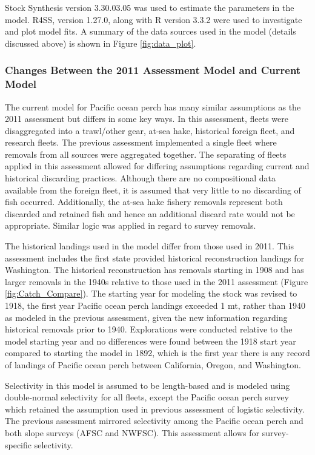 \documentclass[12pt,]{article}
\begin{document}
Stock Synthesis version 3.30.03.05 was used to estimate the parameters
in the model. R4SS, version 1.27.0, along with R version 3.3.2 were used
to investigate and plot model fits. A summary of the data sources used
in the model (details discussed above) is shown in Figure
\ref{fig:data_plot}.

\subsubsection{Changes Between the 2011 Assessment Model and Current
Model}\label{changes-between-the-2011-assessment-model-and-current-model}

The current model for Pacific ocean perch has many similar assumptions
as the 2011 assessment but differs in some key ways. In this assessment,
fleets were disaggregated into a trawl/other gear, at-sea hake,
historical foreign fleet, and research fleets. The previous assessment
implemented a single fleet where removals from all sources were
aggregated together. The separating of fleets applied in this assessment
allowed for differing assumptions regarding current and historical
discarding practices. Although there are no compositional data available
from the foreign fleet, it is assumed that very little to no discarding
of fish occurred. Additionally, the at-sea hake fishery removals
represent both discarded and retained fish and hence an additional
discard rate would not be appropriate. Similar logic was applied in
regard to survey removals.

The historical landings used in the model differ from those used in
2011. This assessment includes the first state provided historical
reconstruction landings for Washington. The historical reconstruction
has removals starting in 1908 and has larger removals in the 1940s
relative to those used in the 2011 assessment (Figure
\ref{fig:Catch_Compare}). The starting year for modeling the stock was
revised to 1918, the first year Pacific ocean perch landings exceeded 1
mt, rather than 1940 as modeled in the previous assessment, given the
new information regarding historical removals prior to 1940.
Explorations were conducted relative to the model starting year and no
differences were found between the 1918 start year compared to starting
the model in 1892, which is the first year there is any record of
landings of Pacific ocean perch between California, Oregon, and
Washington.

Selectivity in this model is assumed to be length-based and is modeled
using double-normal selectivity for all fleets, except the Pacific ocean
perch survey which retained the assumption used in previous assessment
of logistic selectivity. The previous assessment mirrored selectivity
among the Pacific ocean perch and both slope surveys (AFSC and NWFSC).
This assessment allows for survey-specific selectivity.
\end{document}
